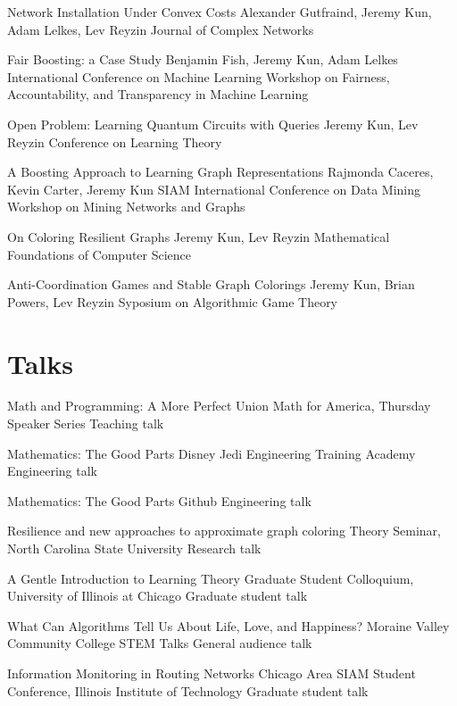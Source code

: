 \documentclass[11pt]{moderncv}
\begin{document}
  {Network Installation Under Convex Costs}
  {Alexander Gutfraind, Jeremy Kun, Adam Lelkes, Lev Reyzin}
  {Journal of Complex Networks}
  {}
  {}

  {Fair Boosting: a Case Study}
  {Benjamin Fish, Jeremy Kun, Adam Lelkes}
  {International Conference on Machine Learning Workshop on Fairness, Accountability, and Transparency in Machine Learning}
  {}
  {}

  {Open Problem: Learning Quantum Circuits with Queries}
  {Jeremy Kun, Lev Reyzin}
  {Conference on Learning Theory}
  {}
  {}

  {A Boosting Approach to Learning Graph Representations}
  {Rajmonda Caceres, Kevin Carter, Jeremy Kun}
  {SIAM International Conference on Data Mining Workshop on Mining Networks and Graphs}
  {}
  {}

  {On Coloring Resilient Graphs}
  {Jeremy Kun, Lev Reyzin}
  {Mathematical Foundations of Computer Science}
  {}
  {}

  {Anti-Coordination Games and Stable Graph Colorings}
  {Jeremy Kun, Brian Powers, Lev Reyzin}
  {Syposium on Algorithmic Game Theory}
  {}
  {}

\section{Talks}

  {Math and Programming: A More Perfect Union}
  {Math for America, Thursday Speaker Series}
  {Teaching talk}
  {}
  {}

  {Mathematics: The Good Parts}
  {Disney Jedi Engineering Training Academy}
  {Engineering talk}
  {}
  {}

  {Mathematics: The Good Parts}
  {Github}
  {Engineering talk}
  {}
  {}

  {Resilience and new approaches to approximate graph coloring}
  {Theory Seminar, North Carolina State University}
  {Research talk}
  {}
  {}

  {A Gentle Introduction to Learning Theory}
  {Graduate Student Colloquium, University of Illinois at Chicago}
  {Graduate student talk}
  {}
  {}

  {What Can Algorithms Tell Us About Life, Love, and Happiness?}
  {Moraine Valley Community College STEM Talks}
  {General audience talk}
  {}
  {}

  {Information Monitoring in Routing Networks}
  {Chicago Area SIAM Student Conference, Illinois Institute of Technology}
  {Graduate student talk}
  {}
  {}
\end{document}
